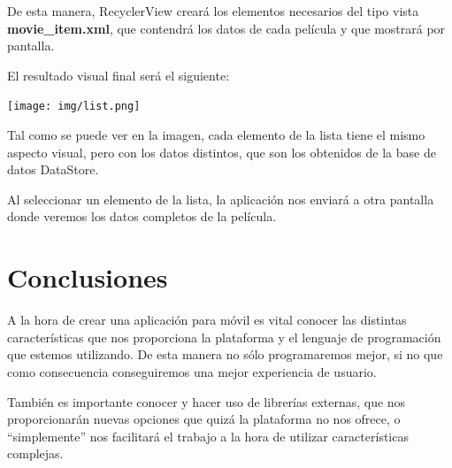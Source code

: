 \documentclass{\ClassPath/viu-tfm-template}
\begin{document}
De esta manera, RecyclerView creará los elementos necesarios del tipo vista \textbf{movie\_item.xml}, que contendrá los datos de cada película y que mostrará por pantalla.


El resultado visual final será el siguiente:

\begin{center}
    \texttt{[image: img/list.png]}
\end{center}


Tal como se puede ver en la imagen, cada elemento de la lista tiene el mismo aspecto visual, pero con los datos distintos, que son los obtenidos de la base de datos DataStore.

Al seleccionar un elemento de la lista, la aplicación nos enviará a otra pantalla donde veremos los datos completos de la película.

\chapter{Conclusiones}

A la hora de crear una aplicación para móvil es vital  conocer las distintas características que nos proporciona la plataforma y el lenguaje de programación que estemos utilizando. De esta manera no sólo programaremos mejor, si no que como consecuencia conseguiremos una mejor experiencia de usuario.

También es importante conocer y hacer uso de librerías externas, que nos proporcionarán nuevas opciones que quizá la plataforma no nos ofrece, o “simplemente” nos facilitará el trabajo a la hora de utilizar características complejas.
\end{document}
